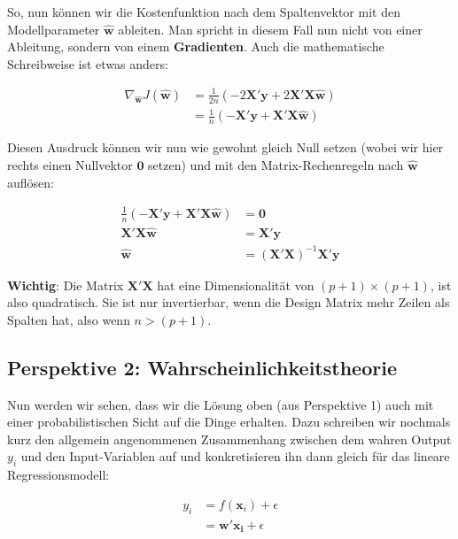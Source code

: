 \documentclass[
]{book}
\begin{document}
So, nun können wir die Kostenfunktion nach dem Spaltenvektor mit den Modellparameter \(\mathbf{\hat{w}}\) ableiten. Man spricht in diesem Fall nun nicht von einer Ableitung, sondern von einem \textbf{Gradienten}. Auch die mathematische Schreibweise ist etwas anders:

\begin{align}
\nabla_{\mathbf{\hat{w}}} J(\mathbf{\hat{w}}) &= \frac{1}{2n} (- 2\mathbf{X}'\mathbf{y} + 2\mathbf{X}'\mathbf{X}\mathbf{\hat{w}}) \\
&= \frac{1}{n} (-\mathbf{X}'\mathbf{y} + \mathbf{X}'\mathbf{X}\mathbf{\hat{w}})
\end{align}

Diesen Ausdruck können wir nun wie gewohnt gleich Null setzen (wobei wir hier rechts einen Nullvektor \(\mathbf{0}\) setzen) und mit den Matrix-Rechenregeln nach \(\mathbf{\hat{w}}\) auflösen:

\begin{align}
\frac{1}{n} (-\mathbf{X}'\mathbf{y} + \mathbf{X}'\mathbf{X}\mathbf{\hat{w}}) &= \mathbf{0} \\
\mathbf{X}'\mathbf{X}\mathbf{\hat{w}} &= \mathbf{X}'\mathbf{y} \\
\mathbf{\hat{w}} &= (\mathbf{X}'\mathbf{X})^{-1}\mathbf{X}'\mathbf{y}
\end{align}

\textbf{Wichtig}: Die Matrix \(\mathbf{X}'\mathbf{X}\) hat eine Dimensionalität von \((p+1) \times (p+1)\), ist also quadratisch. Sie ist nur invertierbar, wenn die Design Matrix mehr Zeilen als Spalten hat, also wenn \(n > (p+1)\).

\hypertarget{perspektive-2-wahrscheinlichkeitstheorie}{%
\subsection{Perspektive 2: Wahrscheinlichkeitstheorie}\label{perspektive-2-wahrscheinlichkeitstheorie}}

Nun werden wir sehen, dass wir die Lösung oben (aus Perspektive 1) auch mit einer probabilistischen Sicht auf die Dinge erhalten. Dazu schreiben wir nochmals kurz den allgemein angenommenen Zusammenhang zwischen dem wahren Output \(y_i\) und den Input-Variablen auf und konkretisieren ihn dann gleich für das lineare Regressionsmodell:

\begin{align}
y_i &= f(\mathbf{x}_i) + \epsilon \\
&= \mathbf{w}' \mathbf{x_i} + \epsilon \\
\end{align}
\end{document}

